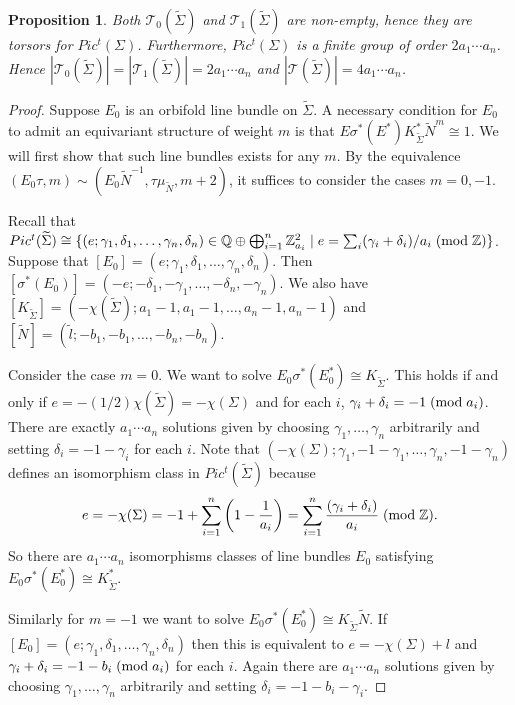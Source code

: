 \documentclass{amsart}
\newtheorem{proposition}[theorem]{Proposition}
\theoremstyle{definition}
\theoremstyle{remark}
\numberwithin{equation}{section}
\begin{document}
\begin{proposition}
Both $\mathcal{T}_0(\widetilde{\Sigma})$ and $\mathcal{T}_1(\widetilde{\Sigma})$ are non-empty, hence they are torsors for $Pic^t(\Sigma)$. Furthermore, $Pic^t(\Sigma)$ is a finite group of order $2a_1 \cdots a_n$. Hence $| \mathcal{T}_0(\widetilde{\Sigma}) | = |\mathcal{T}_1(\widetilde{\Sigma}) | = 2a_1 \cdots a_n$ and $|\mathcal{T}(\widetilde{\Sigma})| = 4a_1 \cdots a_n$.
\end{proposition}
\begin{proof}
Suppose $E_0$ is an orbifold line bundle on $\widetilde{\Sigma}$. A necessary condition for $E_0$ to admit an equivariant structure of weight $m$ is that $E \sigma^*(E^*) K_{\widetilde{\Sigma}}^* \widetilde{N}^m \cong 1$. We will first show that such line bundles exists for any $m$. By the equivalence $(E_0 \tau , m) \sim (E_0 \widetilde{N}^{-1} , \tau \mu_{\widetilde{N}} , m+2)$, it suffices to consider the cases $m = 0,-1$.

Recall \cite{moy} that $Pic^t(\widetilde{\Sigma}) \cong \{ (e ; \gamma_1 , \delta_1 , \dots , \gamma_n , \delta_n) \in \mathbb{Q} \oplus \bigoplus_{i=1}^n \mathbb{Z}_{a_i}^2 \; | \; e = \sum_i (\gamma_i + \delta_i)/a_i \; ({\rm mod} \; \mathbb{Z}) \}$. Suppose that $[E_0] = (e ; \gamma_1 , \delta_1 , \dots , \gamma_n , \delta_n)$. Then $[\sigma^*(E_0)] = (-e ; -\delta_1 , -\gamma_1 , \dots , -\delta_n , -\gamma_n)$. We also have $[K_{\widetilde{\Sigma}}] = ( -\chi(\widetilde{\Sigma}) ; a_1-1 , a_1 - 1 , \dots , a_n - 1 , a_n - 1)$ and $[\widetilde{N}] = ( \widetilde{l} ; -b_1 , -b_1 , \dots , -b_n , -b_n)$.

Consider the case $m=0$. We want to solve $E_0 \sigma^*(E_0^*) \cong K_{\widetilde{\Sigma}}$. This holds if and only if $e = -(1/2)\chi(\widetilde{\Sigma}) = -\chi(\Sigma)$ and for each $i$, $\gamma_i + \delta_i = -1 \; ({\rm mod} \; a_i)$. There are exactly $a_1 \cdots a_n$ solutions given by choosing $\gamma_1, \dots , \gamma_n$ arbitrarily and setting $\delta_i = -1 - \gamma_i$ for each $i$. Note that $( -\chi(\Sigma) ; \gamma_1 , -1-\gamma_1 , \dots , \gamma_n , -1-\gamma_n)$ defines an isomorphism class in $Pic^t(\widetilde{\Sigma})$ because
\[
e = -\chi(\Sigma) = -1 + \sum_{i=1}^n \left( 1 - \frac{1}{a_i} \right) = \sum_{i=1}^{n} \frac{(\gamma_i + \delta_i)}{a_i} \; ({\rm mod} \; \mathbb{Z}).
\]
So there are $a_1 \cdots a_n$ isomorphisms classes of line bundles $E_0$ satisfying $E_0 \sigma^*(E_0^*) \cong K_{\widetilde{\Sigma}}^*$.


Similarly for $m=-1$ we want to solve $E_0 \sigma^*(E_0^*) \cong K_{\widetilde{\Sigma}} \widetilde{N}$. If $[E_0] = (e ; \gamma_1 , \delta_1 , \dots , \gamma_n , \delta_n)$ then this is equivalent to $e = -\chi(\Sigma) + l$ and $\gamma_i + \delta_i = -1 - b_i \; ({\rm mod} \; a_i)$ for each $i$. Again there are $a_1 \cdots a_n$ solutions given by choosing $\gamma_1, \dots , \gamma_n$ arbitrarily and setting $\delta_i = -1 - b_i - \gamma_i$.


\end{proof}
\end{document}
